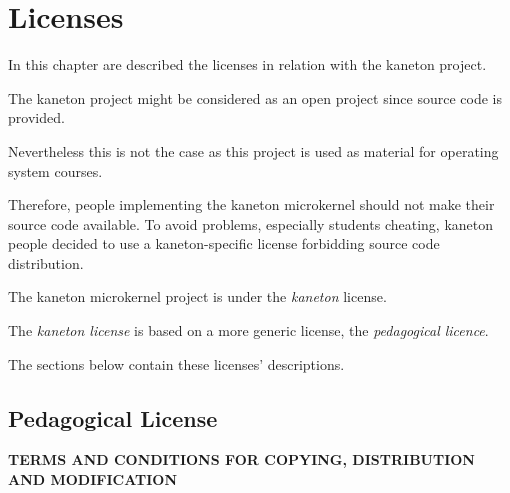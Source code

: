%
%
%
%
%
%

%
%

\chapter{Licenses}
\label{chapter:licenses}

In this chapter are described the licenses in relation with the kaneton
project.

\newpage

%
%

The kaneton project might be considered as an open project since source
code is provided.

Nevertheless this is not the case as this project is used as material for
operating system courses.

Therefore, people implementing the kaneton microkernel should not
make their source code available. To avoid problems, especially students
cheating, kaneton people decided to use a kaneton-specific license
forbidding source code distribution.

The kaneton microkernel project is under the \textit{kaneton} license.

The \textit{kaneton license} is based on a more generic license, the
\textit{pedagogical licence}.

The sections below contain these licenses' descriptions.

%
%

\section{Pedagogical License}
\label{section:pedagogical license}

\textbf{TERMS AND CONDITIONS FOR COPYING, DISTRIBUTION AND MODIFICATION}

